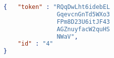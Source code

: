 \documentclass[aspectratio=0510]{beamer}
\begin{document}
    \begin{lstlisting}[language=json,firstnumber=1]
{   "token" : "RQqDwLht6idebEL
               GqevcnGnTd5WXo3
               FPm8D23U6itJF43
               AGZnuyfacW2quHS
               NWaV",
    "id" : "4"
}
    \end{lstlisting}
\end{document}
